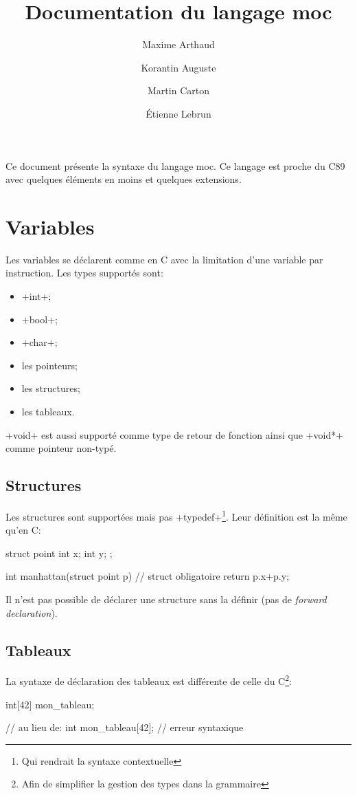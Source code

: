 \documentclass{article}
\author{
       Maxime Arthaud
  \and Korantin Auguste
  \and Martin Carton
  \and Étienne Lebrun
}
\title{Documentation du langage moc}
\begin{document}
  \maketitle
  \tableofcontents
  \newpage

  Ce document présente la syntaxe du langage moc. Ce langage est proche du C89
  avec quelques éléments en moins et quelques extensions.

  \section{Variables}
    Les variables se déclarent comme en C avec la limitation d'une variable par
    instruction. Les types supportés sont:
    \begin{itemize}
      \item \imoc+int+;
      \item \imoc+bool+;
      \item \imoc+char+;
      \item les pointeurs;
      \item les structures;
      \item les tableaux.
    \end{itemize}

    \imoc+void+ est aussi supporté comme type de retour de fonction ainsi que
    \imoc+void*+ comme pointeur non-typé.

    \subsection{Structures}
      Les structures sont supportées mais pas \imoc+typedef+\footnote{Qui
      rendrait la syntaxe contextuelle}. Leur définition est la même qu'en C:

      \begin{moc}
struct point {
    int x;
    int y;
};

int manhattan(struct point p) { // struct obligatoire
    return p.x+p.y;
}
      \end{moc}

      Il n'est pas possible de déclarer une structure sans la définir (pas de
      \emph{forward declaration}).

    \subsection{Tableaux}
      La syntaxe de déclaration des tableaux est différente de celle du
      C\footnote{Afin de simplifier la gestion des types dans la grammaire}:
      \begin{moc}
int[42] mon_tableau;

// au lieu de:
int mon_tableau[42]; // erreur syntaxique
      \end{moc}
\end{document}
